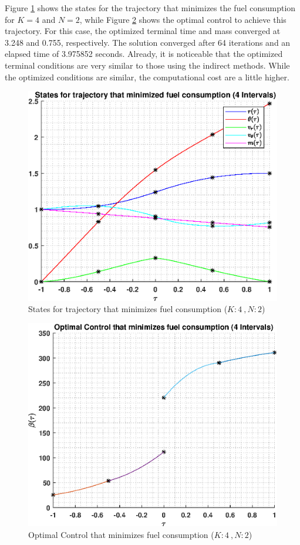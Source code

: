 \documentclass[]{article}
\begin{document}
Figure \ref{fig:directStatesK4Poly2} shows the states for the trajectory that minimizes the fuel consumption for \(K = 4\) and  \(N = 2\), while Figure \ref{fig:directControlK4Poly2} shows the optimal control to achieve this trajectory. For this case, the optimized terminal time and mass converged at 3.248 and  0.755, respectively. The solution converged after 64 iterations and an elapsed time of 3.975852 seconds. Already, it is noticeable that the optimized terminal conditions are very similar to those using the indirect methods. While the optimized conditions are similar, the computational cost are a little higher.
\begin{figure}
	\centering
	\includegraphics[scale=0.75]{directStatesK4Poly2.eps}
	\caption{States for trajectory that minimizes fuel consumption (\(K:4\ , N:2\))}
	\label{fig:directStatesK4Poly2}
\end{figure}
\begin{figure}
	\centering
	\includegraphics[scale=0.75]{directControlK4Poly2.eps}
	\caption{Optimal Control that minimizes fuel consumption (\(K:4\ , N:2\))}
	\label{fig:directControlK4Poly2}
\end{figure}
\FloatBarrier
\end{document}
